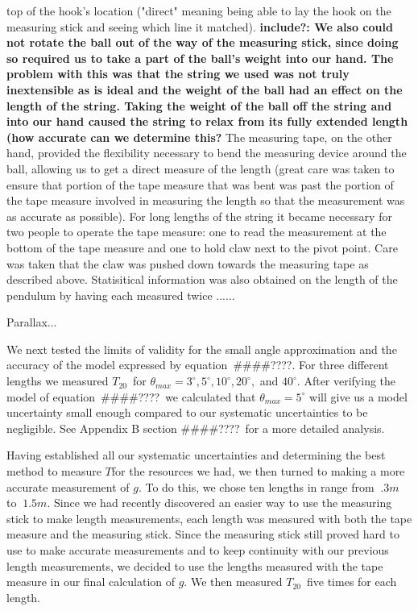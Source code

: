 \documentclass[iop]{emulateapj}
\def\g{$g$}
\def\T{$T$}
\def\Ttwen{$T_{20}$}
\def\fillin{\#\#\#\#????}
\def\deg{^{\circ}}
\begin{document}
top of the hook's location ("direct" meaning being able to lay the hook on the 
measuring stick and seeing which line it matched). {\bf include?:  We also could not rotate 
the ball out of the way of the measuring stick, since doing so required us to 
take a part of the ball's weight into our hand.  The problem with this was 
that the string we used was not truly inextensible as is ideal and the weight 
of the ball had an effect on the length of the string.  Taking the weight of 
the ball off the string and into our hand caused the string to relax from its 
fully extended length (how accurate can we determine this?}  The measuring 
tape, on the other hand, provided the flexibility necessary to bend the 
measuring device around the ball, allowing us to get a direct measure of the 
length (great care was taken to ensure that portion of the tape measure that 
was bent was past the portion of the tape measure involved in measuring the 
length so that the measurement was as accurate as possible). For long lengths 
of the string it became necessary for two people to operate the tape measure:
one to read the measurement at the bottom of the tape measure and one to hold 
claw next to the pivot point.  Care was taken that the claw was pushed down 
towards the measuring tape as described above.  Statisitical information was 
also obtained on the length of the pendulum by having each measured twice
......%

Parallax...

We next tested the limits of validity for the small angle approximation and 
the accuracy of the model expressed by equation~\fillin. %
For three different lengths we measured \Ttwen\ for $\theta_{max} = 3\deg, 
5\deg, 10\deg, 20\deg,$ and $40\deg$.  %
After verifying the model of equation~\fillin\ we calculated that 
$\theta_{max}=5\deg$ will give us a model uncertainty small enough compared 
to our systematic uncertainties to be negligible.  See Appendix B section 
\fillin\ for a more detailed analysis.

Having established all our systematic uncertainties and determining the best 
method to measure \T for the resources we had, we then turned to making a more 
accurate measurement of \g.  To do this, we chose ten lengths in range from 
$~.3m$ to $~1.5m$.  Since we had recently discovered an easier way to use the 
measuring stick to make length measurements, each length was measured with 
both the tape measure and the measuring stick.  Since the measuring stick 
still proved hard to use to make accurate measurements and to keep continuity 
with our previous length measurements, we decided to use the lengths measured 
with the tape measure in our final calculation of \g. We then measured 
\Ttwen\ five times for each length.  
\end{document}
